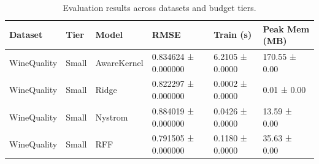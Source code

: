\begin{table}[ht]
\centering
\small
\begin{tabular}{llllll}
\toprule
Dataset & Tier & Model & RMSE & Train (s) & Peak Mem (MB) \\
\midrule
WineQuality & Small & AwareKernel & 0.834624 ± 0.000000 & 6.2105 ± 0.0000 & 170.55 ± 0.00 \\
WineQuality & Small & Ridge & 0.822297 ± 0.000000 & 0.0002 ± 0.0000 & 0.01 ± 0.00 \\
WineQuality & Small & Nystrom & 0.884019 ± 0.000000 & 0.0426 ± 0.0000 & 13.59 ± 0.00 \\
WineQuality & Small & RFF & 0.791505 ± 0.000000 & 0.1180 ± 0.0000 & 35.63 ± 0.00 \\
\midrule
\bottomrule
\end{tabular}
\caption{Evaluation results across datasets and budget tiers.}
\end{table}